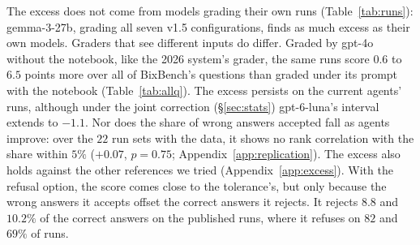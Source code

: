 \documentclass{article}
\begin{document}
The excess does not come from models grading their own runs (Table~\ref{tab:runs}):
gemma-3-27b, grading all seven v1.5 configurations, finds as much excess as their own models. Graders that see
different inputs do differ. Graded by gpt-4o without the notebook, like the 2026 system's grader, the same runs score
$0.6$ to $6.5$ points more over all of BixBench's questions than graded under its prompt with the notebook
(Table~\ref{tab:allq}). The excess persists on the current agents' runs, although under the joint correction
(\S\ref{sec:stats}) gpt-6-luna's interval extends to $-1.1$. Nor does the share of wrong answers accepted fall as
agents improve: over the $22$ run sets with the data, it shows no rank correlation with the share within $5\%$
($+0.07$, $p=0.75$; Appendix~\ref{app:replication}). The excess also holds against the other references we tried
(Appendix~\ref{app:excess}). With the refusal option, the score comes close to the tolerance's, but only because the wrong
answers it accepts offset the correct answers it rejects. It rejects $8.8$ and $10.2\%$ of the correct answers on the
published runs, where it refuses on $82$ and $69\%$ of runs.
\end{document}
